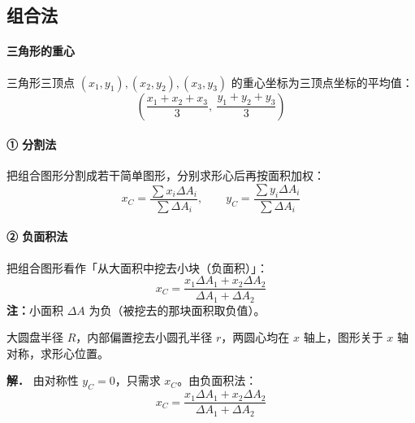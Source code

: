 \subsection{组合法}

\paragraph{三角形的重心} 三角形三顶点 $(x_1,y_1),(x_2,y_2),(x_3,y_3)$ 的重心坐标为三顶点坐标的平均值：
\begin{equation}
\left(\frac{x_1+x_2+x_3}{3},\ \frac{y_1+y_2+y_3}{3}\right)
\label{eq:3-重心-三角形}
\end{equation}

\paragraph{① 分割法} 把组合图形分割成若干简单图形，分别求形心后再按面积加权：
\begin{equation}
x_C=\frac{\sum x_i\Delta A_i}{\sum\Delta A_i},\qquad y_C=\frac{\sum y_i\Delta A_i}{\sum\Delta A_i}
\label{eq:3-重心-分割}
\end{equation}

\paragraph{② 负面积法} 把组合图形看作「从大面积中挖去小块（负面积）」：
\begin{equation}
x_C=\frac{x_1\Delta A_1+x_2\Delta A_2}{\Delta A_1+\Delta A_2}
\label{eq:3-重心-负面积}
\end{equation}
\textbf{注：}小面积 $\Delta A$ 为负（被挖去的那块面积取负值）。

\begin{example}[带偏心圆孔的圆盘形心]
大圆盘半径 $R$，内部偏置挖去小圆孔半径 $r$，两圆心均在 $x$ 轴上，图形关于 $x$ 轴对称，求形心位置。

\textbf{解．} 由对称性 $y_C=0$，只需求 $x_C$。由负面积法：
\begin{equation}
x_C=\frac{x_1\Delta A_1+x_2\Delta A_2}{\Delta A_1+\Delta A_2}
\label{eq:3-重心-孔盘公式}
\end{equation}
\end{example}
